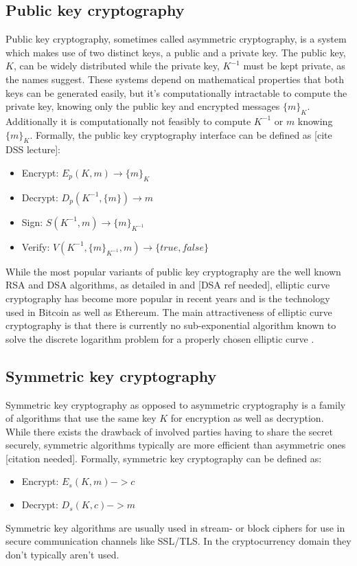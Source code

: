 \documentclass[12pt,msc,a4paper,oneside]{ucl_thesis}
\begin{document}
\subsection{Public key cryptography}
Public key cryptography, sometimes called asymmetric cryptography, is a system which makes use of two distinct keys, a public and a private key. The public key, $K$, can be widely distributed while the private key, $K^{-1}$ must be kept private, as the names suggest. These systems depend on mathematical properties that both keys can be generated easily, but it's computationally intractable to compute the private key, knowing only the public key and encrypted messages $\{m\}_K$. Additionally it is computationally not feasibly to compute $K^{-1}$ or $m$ knowing $\{m\}_K$. Formally, the public key cryptography interface can be defined as [cite DSS lecture]:
\begin{itemize}
    \item{Encrypt: } $E_p(K, m) \rightarrow \{m\}_K$
    \item{Decrypt: } $D_p(K^{-1}, \{m\}) \rightarrow m$
    \item{Sign: }    $S(K^{-1}, m) \rightarrow \{m\}_{K^{-1}}$
    \item{Verify: }  $V(K^{-1}, \{m\}_{K^{-1}}, m) \rightarrow \{true, false\}$
\end{itemize}

While the most popular variants of public key cryptography are the well known RSA and DSA algorithms, as detailed in \cite{RSA:1978:MOD:359340.359342} and [DSA ref needed], elliptic curve cryptography has become more popular in recent years and is the technology used in Bitcoin as well as Ethereum. The main attractiveness of elliptic curve cryptography is that there is currently no sub-exponential algorithm known to solve the discrete logarithm problem for a properly chosen elliptic curve \cite{EllipticCurveOverview}.

\subsection{Symmetric key cryptography}
Symmetric key cryptography as opposed to asymmetric cryptography is a family of algorithms that use the same key $K$ for encryption as well as decryption. While there exists the drawback of involved parties having to share the secret securely, symmetric algorithms typically are more efficient than asymmetric ones [citation needed]. Formally, symmetric key cryptography can be defined as:
\begin{itemize}
    \item{Encrypt: } $E_s(K, m) -> c$
    \item{Decrypt: } $D_s(K, c) -> m$
\end{itemize}
Symmetric key algorithms are usually used in stream- or block ciphers for use in secure communication channels like SSL/TLS. In the cryptocurrency domain they don't typically aren't used.
\end{document}
